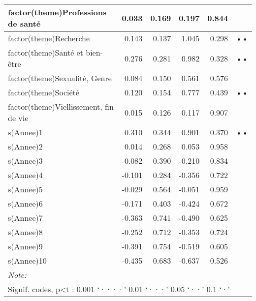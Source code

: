 \documentclass[
  letterpaper,
  DIV=11,
  numbers=noendperiod]{scrartcl}
\begin{document}
\begin{table}
\begin{minipage}[t]{\linewidth}
{\begin{tabular}[t]{l|r|r|r|r|l}
\hline
factor(theme)Professions de santé & 0.033 & 0.169 & 0.197 & 0.844 & \\
\hline
factor(theme)Recherche & 0.143 & 0.137 & 1.045 & 0.298 & ••\\
\hline
factor(theme)Santé et bien-être & 0.276 & 0.281 & 0.982 & 0.328 & ••\\
\hline
factor(theme)Sexualité, Genre & 0.084 & 0.150 & 0.561 & 0.576 & \\
\hline
factor(theme)Société & 0.120 & 0.154 & 0.777 & 0.439 & ••\\
\hline
factor(theme)Viellissement, fin de vie & 0.015 & 0.126 & 0.117 & 0.907 & \\
\hline
s(Annee)1 & 0.310 & 0.344 & 0.901 & 0.370 & ••\\
\hline
s(Annee)2 & 0.014 & 0.268 & 0.053 & 0.958 & \\
\hline
s(Annee)3 & -0.082 & 0.390 & -0.210 & 0.834 & \\
\hline
s(Annee)4 & -0.101 & 0.284 & -0.356 & 0.722 & \\
\hline
s(Annee)5 & -0.029 & 0.564 & -0.051 & 0.959 & \\
\hline
s(Annee)6 & -0.171 & 0.403 & -0.424 & 0.672 & \\
\hline
s(Annee)7 & -0.363 & 0.741 & -0.490 & 0.625 & \\
\hline
s(Annee)8 & -0.252 & 0.712 & -0.353 & 0.724 & \\
\hline
s(Annee)9 & -0.391 & 0.754 & -0.519 & 0.605 & \\
\hline
s(Annee)10 & -0.435 & 0.683 & -0.637 & 0.526 & \\
\hline
\multicolumn{6}{l}{\rule{0pt}{1em}\textit{Note: }}\\
\multicolumn{6}{l}{\rule{0pt}{1em}Signif. codes, p<t : 0.001 ‘····’ 0.01 ‘···’ 0.05 ‘··’ 0.1 ‘·’ }\\
\end{tabular}

}

\end{minipage}%
\newline
\begin{minipage}[t]{\linewidth}

{\centering 

}
\end{minipage}
\end{table}
\end{document}
